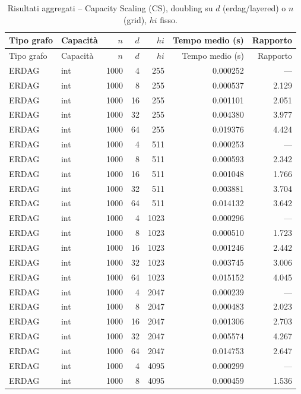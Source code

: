 \begin{longtable}{l l r r r r r}
\caption{Risultati aggregati -- Capacity Scaling (CS), doubling su $d$ (erdag/layered) o $n$ (grid), $hi$ fisso.}
\label{tab:cs_doubling_nd} \\
\toprule
Tipo grafo & Capacit\`a & $n$ & $d$ & $hi$ & Tempo medio (s) & Rapporto \\
\midrule
\endfirsthead
\toprule
Tipo grafo & Capacit\`a & $n$ & $d$ & $hi$ & Tempo medio (s) & Rapporto \\
\midrule
\endhead
\bottomrule
\endfoot
ERDAG & int & 1000 & 4 & 255 & 0.000252 & --- \\
ERDAG & int & 1000 & 8 & 255 & 0.000537 & 2.129 \\
ERDAG & int & 1000 & 16 & 255 & 0.001101 & 2.051 \\
ERDAG & int & 1000 & 32 & 255 & 0.004380 & 3.977 \\
ERDAG & int & 1000 & 64 & 255 & 0.019376 & 4.424 \\
\addlinespace
ERDAG & int & 1000 & 4 & 511 & 0.000253 & --- \\
ERDAG & int & 1000 & 8 & 511 & 0.000593 & 2.342 \\
ERDAG & int & 1000 & 16 & 511 & 0.001048 & 1.766 \\
ERDAG & int & 1000 & 32 & 511 & 0.003881 & 3.704 \\
ERDAG & int & 1000 & 64 & 511 & 0.014132 & 3.642 \\
\addlinespace
ERDAG & int & 1000 & 4 & 1023 & 0.000296 & --- \\
ERDAG & int & 1000 & 8 & 1023 & 0.000510 & 1.723 \\
ERDAG & int & 1000 & 16 & 1023 & 0.001246 & 2.442 \\
ERDAG & int & 1000 & 32 & 1023 & 0.003745 & 3.006 \\
ERDAG & int & 1000 & 64 & 1023 & 0.015152 & 4.045 \\
\addlinespace
ERDAG & int & 1000 & 4 & 2047 & 0.000239 & --- \\
ERDAG & int & 1000 & 8 & 2047 & 0.000483 & 2.023 \\
ERDAG & int & 1000 & 16 & 2047 & 0.001306 & 2.703 \\
ERDAG & int & 1000 & 32 & 2047 & 0.005574 & 4.267 \\
ERDAG & int & 1000 & 64 & 2047 & 0.014753 & 2.647 \\
\addlinespace
ERDAG & int & 1000 & 4 & 4095 & 0.000299 & --- \\
ERDAG & int & 1000 & 8 & 4095 & 0.000459 & 1.536 \\

\end{longtable}

